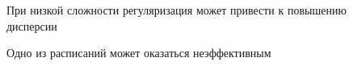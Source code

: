 \documentclass[12pt, twoside]{article}
\begin{document}
\begin{figure}[h!]
\caption{При низкой сложности регуляризация может привести к повышению дисперсии }
\end{figure}
\begin{figure}[h!]
\caption{Одно из расписаний может оказаться неэффективным }
\end{figure}

\newpage
\end{document}
